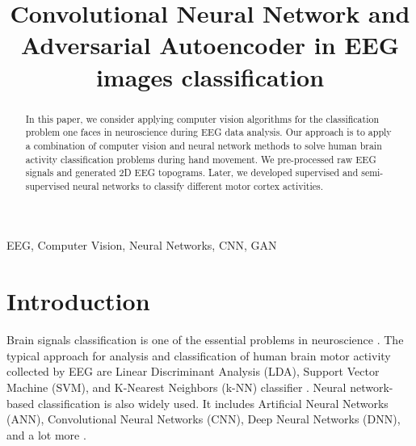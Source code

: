\documentclass[conference]{IEEEtran}
\begin{document}
\title{Convolutional Neural Network and Adversarial Autoencoder in EEG images classification\\
}
\author{
		\and
		}


\maketitle

\begin{abstract}
In this paper, we consider applying computer vision algorithms for the classification problem one faces in neuroscience during EEG data analysis. Our approach is to apply a combination of computer vision and neural network methods to solve human brain activity classification problems during hand movement. We pre-processed raw EEG signals and generated 2D EEG topograms. Later, we developed supervised and semi-supervised neural networks to classify different motor cortex activities.
\end{abstract}

\begin{IEEEkeywords}
EEG, Computer Vision, Neural Networks, CNN, GAN
\end{IEEEkeywords}

\section{Introduction}
Brain signals classification is one of the essential problems in neuroscience \cite{chholak2019phase, kurkin2019machine, Gordleeva2020, kurkin2021oxygen, bukina2021modern, chholak2021event, maksimenko2021effect, kurkin2020system, kurkin2019artificial}. The typical approach for analysis and classification of human brain motor activity collected by EEG are Linear Discriminant Analysis (LDA), Support Vector Machine (SVM), and K-Nearest Neighbors (k-NN) classifier \cite{cha2019analysis, Gordleeva2017, Liburkina2018, Grigorev2020, badarin2020studying}. Neural network-based classification is also widely used. It includes Artificial Neural Networks (ANN), Convolutional Neural Networks (CNN), Deep Neural Networks (DNN), and a lot more \cite{andreev2019synchronization, andreev2021synchronization, ponomarenko2021assessment}.
\end{document}
